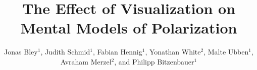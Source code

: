 \title[Mental models and polarization]{The Effect of Visualization on Mental Models of Polarization}
\author{Jonas Bley$^1$, Judith Schmid$^1$, Fabian Hennig$^1$, Yonathan White$^2$, Malte Ubben$^1$, Avraham Merzel$^2$, and Philipp Bitzenbauer$^1$}
\date{}
